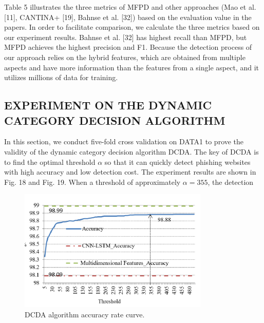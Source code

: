 \documentclass{ieeeaccess}
\begin{document}
Table 5 illustrates the three metrics of MFPD and
other approaches (Mao et al. [11], CANTINA+ [19],
Bahnse et al. [32]) based on the evaluation value in the papers.
In order to facilitate comparison, we calculate the three metrics
based on our experiment results. Bahnse et al. [32] has
highest recall than MFPD, but MFPD achieves the highest
precision and F1. Because the detection process of our
approach relies on the hybrid features, which are obtained
from multiple aspects and have more information than the
features from a single aspect, and it utilizes millions of data
for training.

\subsection{EXPERIMENT ON THE DYNAMIC CATEGORY
DECISION ALGORITHM}
In this section, we conduct five-fold cross validation on
DATA1 to prove the validity of the dynamic category decision
algorithm DCDA. The key of DCDA is to find the optimal
threshold $\alpha$ so that it can quickly detect phishing websites
with high accuracy and low detection cost.
The experiment results are shown in Fig. 18 and Fig. 19.
When a threshold of approximately $\alpha = 355$, the detection
\begin{figure}
    \centering
    \includegraphics[width=\linewidth]{figure18.png}
    \caption{DCDA algorithm accuracy rate curve.}
    \label{fig:18}
\end{figure}
\end{document}
